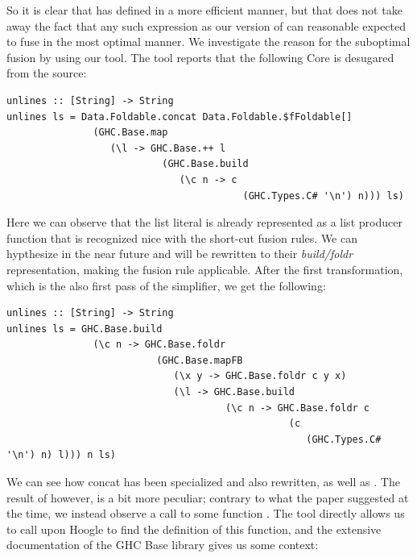 So it is clear that  has defined  in a more efficient manner, but that does not take away the fact that any such
expression as our version of  can reasonable expected to fuse in the most optimal manner. We investigate the reason for the suboptimal
fusion by using our tool. The tool reports that the following Core is desugared from the source:

\begin{listing}[H]
\begin{verbatim}
unlines :: [String] -> String
unlines ls = Data.Foldable.concat Data.Foldable.$fFoldable[]
               (GHC.Base.map
                  (\l -> GHC.Base.++ l
                           (GHC.Base.build
                              (\c n -> c
                                         (GHC.Types.C# '\n') n))) ls)
\end{verbatim}
\end{listing}

Here we can observe that the list literal \mono{['\n']} is already represented as a list producer function that is recognized nice with the short-cut fusion
rules. We can hypthesize in the near future  and \mono{++} will be rewritten to their \textit{build/foldr} representation, making the fusion rule
applicable. After the first transformation, which is the also first pass of the simplifier, we get the following:

\begin{listing}[H]
\begin{verbatim}
unlines :: [String] -> String
unlines ls = GHC.Base.build
               (\c n -> GHC.Base.foldr
                          (GHC.Base.mapFB
                             (\x y -> GHC.Base.foldr c y x)
                             (\l -> GHC.Base.build
                                      (\c n -> GHC.Base.foldr c
                                                 (c
                                                    (GHC.Types.C# '\n') n) l))) n ls)
\end{verbatim}
\end{listing}

We can see how concat has been specialized and also rewritten, as well as \mono{++}. The result of  however, is a bit more peculiar; contrary to what the paper
suggested at the time, we instead observe a call to some function . The tool directly allows us to call upon Hoogle to find the definition of this function,
and the extensive documentation of the GHC Base library gives us some context:

